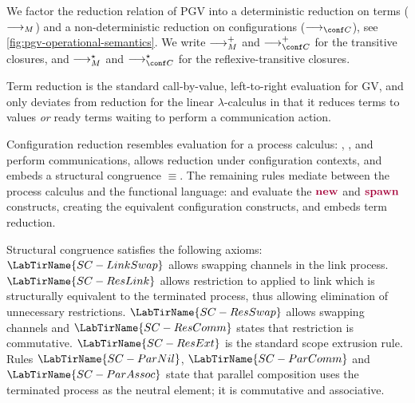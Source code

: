 \documentclass[main.tex]{subfiles}
\begin{document}


We factor the reduction relation of PGV into a deterministic reduction on terms ($\longrightarrow_{M}$) and a non-deterministic reduction on configurations ($\cred$), see \cref{fig:pgv-operational-semantics}. We write $\longrightarrow_{M}^+$ and $\cred^+$ for the transitive closures, and $\longrightarrow_{M}^\star$ and $\cred^\star$ for the reflexive-transitive closures.

Term reduction is the standard call-by-value, left-to-right evaluation for GV, and only deviates from reduction for the linear $\lambda$-calculus in that it reduces terms to values \emph{or} ready terms waiting to perform a communication action.

Configuration reduction resembles evaluation for a process calculus: , , and  perform communications,  allows reduction under configuration contexts, and  embeds a structural congruence $\equiv$. The remaining rules mediate between the process calculus and the functional language:  and  evaluate the $\tm{\new}$ and $\tm{\spawn}$ constructs, creating the equivalent configuration constructs, and  embeds term reduction.

Structural congruence satisfies the following axioms: $\LabTirName{SC-LinkSwap}$ allows swapping channels in the link process. $\LabTirName{SC-ResLink}$ allows restriction to applied to link which is structurally equivalent to the terminated process, thus allowing elimination of unnecessary restrictions. $\LabTirName{SC-ResSwap}$ allows swapping channels and $\LabTirName{SC-ResComm}$ states that restriction is commutative. $\LabTirName{SC-ResExt}$ is the standard scope extrusion rule. Rules $\LabTirName{SC-ParNil}$, $\LabTirName{SC-ParComm}$ and $\LabTirName{SC-ParAssoc}$ state that parallel composition uses the terminated process as the neutral element; it is commutative and associative.
\end{document}
